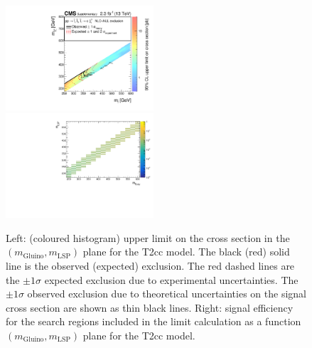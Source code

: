 \clearpage
\begin{figure}[t]
  \begin{center}
    \includegraphics[width=0.49\textwidth]{supplementary/figures/RA1T2ccXSEC} \, 
    \includegraphics[width=0.49\textwidth]{supplementary/figures/T2cc_merging_4_cats} \,     
  \end{center}
  \caption{Left: (coloured histogram) upper limit on the cross section in the $(m_{\mathrm{Gluino}},m_{\mathrm{LSP}})$ plane for the T2cc model. 
  The black (red) solid line is the observed (expected) exclusion. The red dashed lines are the $\pm1\sigma$ expected exclusion due to experimental uncertainties. 
  The $\pm1\sigma$ observed exclusion due to theoretical uncertainties on the signal cross section are shown as thin black lines. 
  Right: signal efficiency for the search regions included in the limit calculation as a function $(m_{\mathrm{Gluino}},m_{\mathrm{LSP}})$ plane for the T2cc model. 
  \label{fig:T2cc_excl}}
\end{figure}

